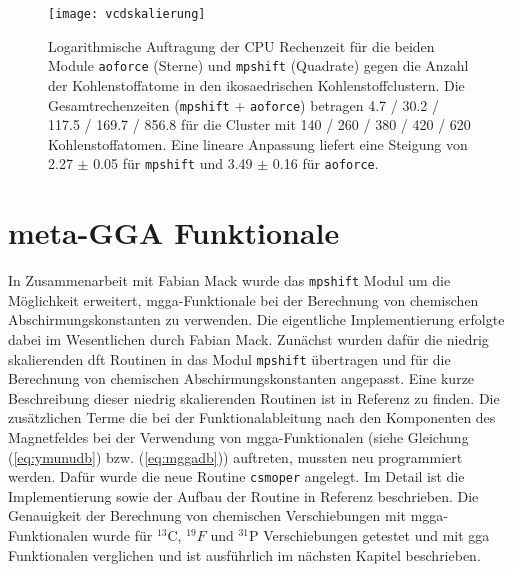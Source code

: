 \begin{figure}[ht!]
	\centering
	\texttt{[image: vcdskalierung]}
	\captionsetup{figurewithin = chapter}
	\captionsetup{font=small, labelfont=bf}\caption[Skalierung von \texttt{mpshift} und \texttt{aoforce}]{ Logarithmische Auftragung der CPU Rechenzeit für die beiden Module \texttt{aoforce} (Sterne) und \texttt{mpshift} (Quadrate) gegen die Anzahl der Kohlenstoffatome in den ikosaedrischen Kohlenstoffclustern. Die Gesamtrechenzeiten (\texttt{mpshift} + \texttt{aoforce}) betragen 4.7 / 30.2 / 117.5 / 169.7 / 856.8 für die Cluster mit 140 / 260 / 380 / 420 / 620 Kohlenstoffatomen. Eine lineare Anpassung liefert eine Steigung von 2.27 $\pm$ 0.05 für \texttt{mpshift} und 3.49 $\pm$ 0.16 für \texttt{aoforce}.}
\label{abb:vcdskalierung}
\end{figure}
	
\section{meta-GGA Funktionale}\label{kap:mgga}
In Zusammenarbeit mit Fabian Mack wurde das \texttt{mpshift} Modul um die Möglichkeit erweitert, \ac{mgga}-Funktionale bei der Berechnung von chemischen Abschirmungskonstanten zu verwenden. Die eigentliche Implementierung erfolgte dabei im Wesentlichen durch Fabian Mack. Zunächst wurden dafür die niedrig skalierenden \ac{dft} Routinen in das Modul \texttt{mpshift} übertragen und für die Berechnung von chemischen Abschirmungskonstanten angepasst. Eine kurze Beschreibung dieser niedrig skalierenden Routinen ist in Referenz \cite{deglmann2002efficient} zu finden. Die zusätzlichen Terme die bei der Funktionalableitung nach den Komponenten des Magnetfeldes bei der Verwendung von \ac{mgga}-Funktionalen (siehe Gleichung (\ref{eq:ymunudb}) bzw. (\ref{eq:mggadb})) auftreten, mussten neu programmiert werden. Dafür wurde die neue Routine \texttt{csmoper} angelegt. Im Detail ist die Implementierung sowie der Aufbau der Routine in Referenz \cite{mack2017} beschrieben. Die Genauigkeit der Berechnung von chemischen Verschiebungen mit \ac{mgga}-Funktionalen wurde für $^{13}$C, $^{19}F$ und $^{31}$P Verschiebungen getestet und mit \ac{gga} Funktionalen verglichen\supercite{reiter2017calculation} und ist ausführlich im nächsten Kapitel beschrieben.
	
	